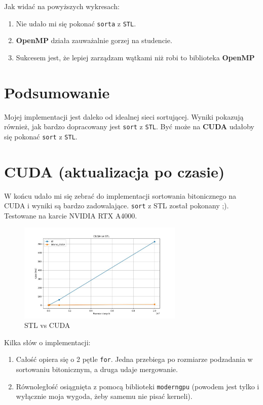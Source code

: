\documentclass{article}
\begin{document}
Jak widać na powyższych wykresach:
\begin{enumerate}
\item Nie udało mi się pokonać \texttt{sorta} z \texttt{STL}.
\item \textbf{OpenMP} działa zauważalnie gorzej na studencie.
\item Sukcesem jest, że lepiej zarządzam wątkami niż robi to biblioteka \textbf{OpenMP}
\end{enumerate}

\section*{Podsumowanie}
Mojej implementacji jest daleko od idealnej sieci sortującej. Wyniki pokazują również, jak bardzo dopracowany jest \texttt{sort} z \texttt{STL}. Być może na \textbf{CUDA} udałoby się pokonać \texttt{sort} z \texttt{STL}.

\newpage

\section*{CUDA (aktualizacja po czasie)}
W końcu udało mi się zebrać do implementacji sortowania bitonicznego na CUDA i wyniki są bardzo zadowalające. \texttt{sort} z STL został pokonany ;). \\
Testowane na karcie NVIDIA RTX A4000.

\begin{figure}[htp]
    \centering
    \includegraphics[width=0.7\textwidth]{stlVsCUDA.jpg}
    \caption{STL vs CUDA}
\end{figure}

Kilka słów o implementacji:
\begin{enumerate}
    \item Całość opiera się o 2 pętle \texttt{for}. Jedna przebiega po rozmiarze podzadania w sortowaniu bitonicznym, a druga udaje mergowanie.
    \item Równoległość osiągnięta z pomocą biblioteki \texttt{moderngpu} (powodem jest tylko i wyłącznie moja wygoda, żeby samemu nie pisać kerneli). 
\end{enumerate}
\end{document}
